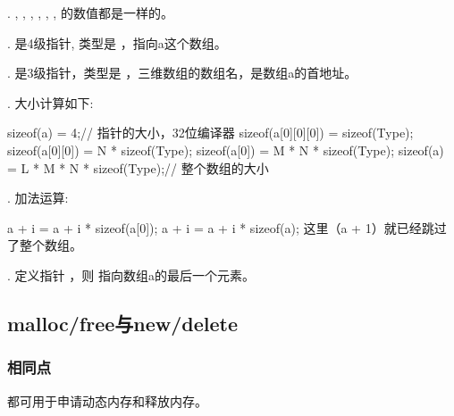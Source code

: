 \documentclass[letterpaper,10pt,english]{sphinxmanual}
\begin{document}
.  ,  ,  ,  ,  ,  ,  的数值都是一样的。

.  是4级指针, 类型是  ，指向a这个数组。

.  是3级指针，类型是  ，三维数组的数组名，是数组a的首地址。

. 大小计算如下:

%
\begin{sphinxVerbatim}[commandchars=\\\{\}]
sizeof(\PYGZam{}a) = 4;// 指针的大小，32位编译器
sizeof(a[0][0][0]) = sizeof(Type);
sizeof(a[0][0]) = N * sizeof(Type);
sizeof(a[0]) = M * N * sizeof(Type);
sizeof(a) = L * M * N * sizeof(Type);// 整个数组的大小
\end{sphinxVerbatim}

. 加法运算:

%
\begin{sphinxVerbatim}[commandchars=\\\{\}]
a + i = a + i * sizeof(a[0]);
\PYGZam{}a + i = a + i * sizeof(a);
这里（\PYGZam{}a + 1）就已经跳过了整个数组。
\end{sphinxVerbatim}

. 定义指针  ，则  指向数组a的最后一个元素。


\subsection{malloc/free与new/delete}
\label{\detokenize{cpp/02_array:malloc-freenew-delete}}

\subsubsection{相同点}
\label{\detokenize{cpp/02_array:id6}}
都可用于申请动态内存和释放内存。
\end{document}
